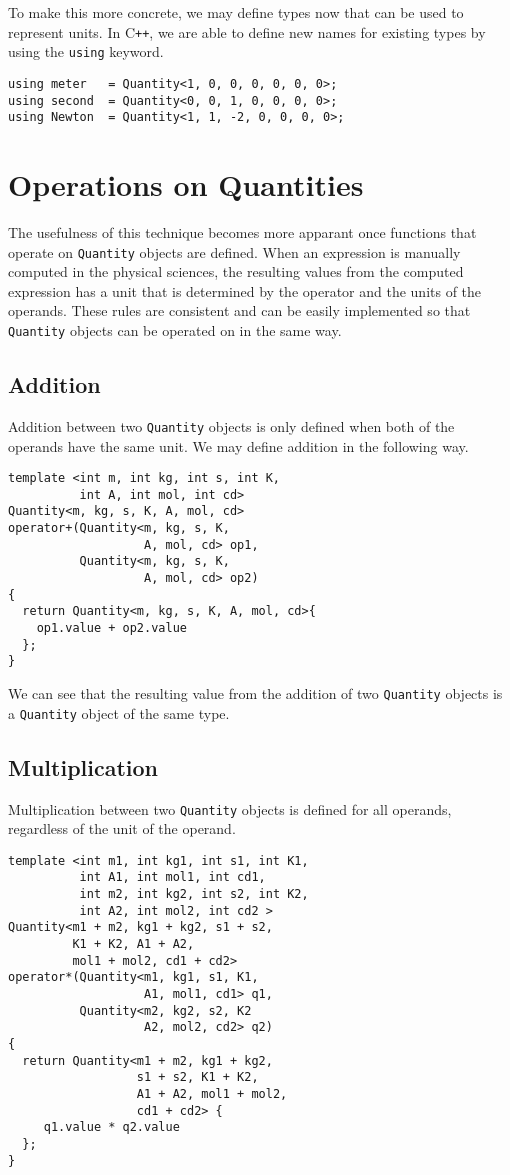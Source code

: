 \documentclass[reprint]{revtex4-1}
\begin{document}
To make this more concrete, we may define types now that can be used to represent units. In C\verb!++!, we
are able to define new names for existing types by using the \verb|using| keyword.
\begin{verbatim}
using meter   = Quantity<1, 0, 0, 0, 0, 0, 0>;
using second  = Quantity<0, 0, 1, 0, 0, 0, 0>;
using Newton  = Quantity<1, 1, -2, 0, 0, 0, 0>;
\end{verbatim}


\section{Operations on Quantities}
The usefulness of this technique becomes more apparant once functions that operate on \verb|Quantity| objects are
defined. When an expression is manually computed in the physical sciences, the resulting values from
the computed expression has a unit that is determined by the operator and the units of the operands.
These rules are consistent and can be easily implemented so that \verb|Quantity| objects can be operated on in
the same way.

\subsection{Addition}
Addition between two \verb|Quantity| objects is only defined when both of the operands have the same unit.
We may define addition in the following way.
\begin{verbatim}
template <int m, int kg, int s, int K,
          int A, int mol, int cd>
Quantity<m, kg, s, K, A, mol, cd>
operator+(Quantity<m, kg, s, K,
                   A, mol, cd> op1,
          Quantity<m, kg, s, K,
                   A, mol, cd> op2)
{
  return Quantity<m, kg, s, K, A, mol, cd>{
    op1.value + op2.value
  };
}
\end{verbatim}

We can see that the resulting value from the addition of two \verb|Quantity| objects is a \verb|Quantity| object
of the same type.
\subsection{Multiplication}
Multiplication between two \verb|Quantity| objects is defined for all operands, regardless of the unit of the
operand.

\begin{verbatim}
template <int m1, int kg1, int s1, int K1,
          int A1, int mol1, int cd1,
          int m2, int kg2, int s2, int K2,
          int A2, int mol2, int cd2 >
Quantity<m1 + m2, kg1 + kg2, s1 + s2,
         K1 + K2, A1 + A2,
         mol1 + mol2, cd1 + cd2>
operator*(Quantity<m1, kg1, s1, K1,
                   A1, mol1, cd1> q1,
          Quantity<m2, kg2, s2, K2
                   A2, mol2, cd2> q2)
{
  return Quantity<m1 + m2, kg1 + kg2,
                  s1 + s2, K1 + K2,
                  A1 + A2, mol1 + mol2,
                  cd1 + cd2> {
     q1.value * q2.value
  };
}
\end{verbatim}
\end{document}
